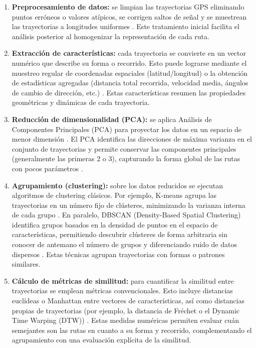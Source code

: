 \begin{enumerate}
\item \textbf{Preprocesamiento de datos:} se limpian las trayectorias GPS eliminando puntos erróneos o valores atípicos, se corrigen saltos de señal y se muestrean las trayectorias a longitudes uniformes \cite{refPreproc}. Este tratamiento inicial facilita el análisis posterior al homogenizar la representación de cada ruta.
\item \textbf{Extracción de características:} cada trayectoria se convierte en un vector numérico que describe su forma o recorrido. Esto puede lograrse mediante el muestreo regular de coordenadas espaciales (latitud/longitud) o la obtención de estadísticas agregadas (distancia total recorrida, velocidad media, ángulos de cambio de dirección, etc.) \cite{refFeatures}. Estas características resumen las propiedades geométricas y dinámicas de cada trayectoria.
\item \textbf{Reducción de dimensionalidad (PCA):} se aplica Análisis de Componentes Principales (PCA) para proyectar los datos en un espacio de menor dimensión \cite{refPCA}. El PCA identifica las direcciones de máxima varianza en el conjunto de trayectorias y permite conservar las componentes principales (generalmente las primeras 2 o 3), capturando la forma global de las rutas con pocos parámetros \cite{refPCA}.
\item \textbf{Agrupamiento (clustering):} sobre los datos reducidos se ejecutan algoritmos de clustering clásicos. Por ejemplo, K-means agrupa las trayectorias en un número fijo de clústeres, minimizando la varianza interna de cada grupo \cite{refKMeans}. En paralelo, DBSCAN (Density-Based Spatial Clustering) identifica grupos basados en la densidad de puntos en el espacio de características, permitiendo descubrir clústeres de forma arbitraria sin conocer de antemano el número de grupos y diferenciando ruido de datos dispersos \cite{refDBSCAN}. Estas técnicas agrupan trayectorias con formas o patrones similares.
\item \textbf{Cálculo de métricas de similitud:} para cuantificar la similitud entre trayectorias se emplean métricas convencionales. Esto incluye distancias euclídeas o Manhattan entre vectores de características, así como distancias propias de trayectorias (por ejemplo, la distancia de Fréchet o el Dynamic Time Warping (DTW)) \cite{refFrechet} \cite{refDTW}. Estas medidas numéricas permiten evaluar cuán semejantes son las rutas en cuanto a su forma y recorrido, complementando el agrupamiento con una evaluación explícita de la similitud.


\end{enumerate}
